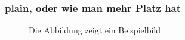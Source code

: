 \documentclass{beamer}
\begin{document}
\begin{frame}[plain]
\frametitle{plain, oder wie man mehr Platz hat}
\begin{figure}
\caption{Die Abbildung zeigt ein Beispielbild}
\end{figure}
\end{frame}
\end{document}
